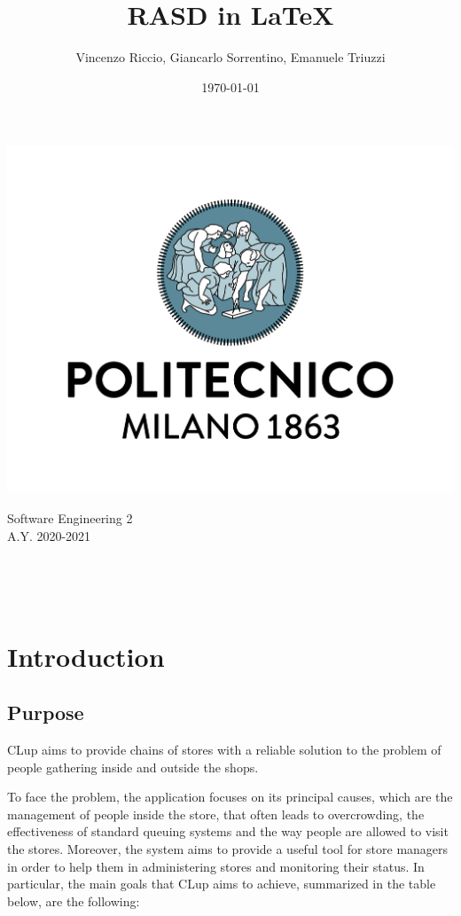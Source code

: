 \documentclass[a4paper,oneside,11pt]{book}   %
\title{RASD in \LaTeX}
\author{Vincenzo Riccio, Giancarlo Sorrentino, Emanuele Triuzzi}
\date{\today}
\begin{document}
\begin{titlingpage} %
    \begin{center}
        \includegraphics[height=0.52\linewidth]{pictures/polimi}\\ %
        \begin{large}
            Software Engineering 2 \\ %
            A.Y. 2020-2021\\
        \end{large}
        \vspace{4cm} %
        \begin{large} 
            \textbf{\thetitle} \\
        \end{large}
        \theauthor\\
        \vspace{8cm} %
        \thedate
    \end{center}
\end{titlingpage}

\newpage
{}
\tableofcontents
\newpage
{}
\chapter{Introduction}
    
    \section{Purpose}
    CLup aims to provide chains of stores with a reliable solution to the problem of people gathering inside and outside the shops. \par
    To face the problem, the application focuses on its principal causes, which are the management of people inside the store, that often leads to overcrowding, the effectiveness of standard queuing systems and the way people are allowed to visit the stores. Moreover, the system aims to provide a useful tool for store managers in order to help them in administering stores and monitoring their status. In particular, the main goals that CLup aims to achieve, summarized in the table below, are the following: 
\end{document}
